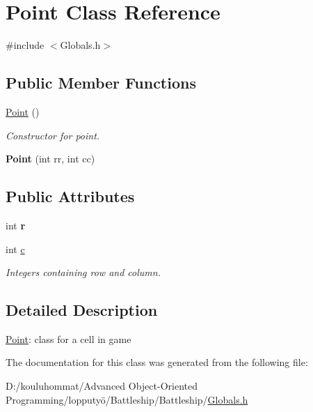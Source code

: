 \hypertarget{class_point}{}\section{Point Class Reference}
\label{class_point}


{\ttfamily \#include $<$Globals.\+h$>$}

\subsection*{Public Member Functions}
\begin{DoxyCompactItemize}
\item 
\mbox{\label{class_point_ad92f2337b839a94ce97dcdb439b4325a}} 
\mbox{\hyperlink{class_point_ad92f2337b839a94ce97dcdb439b4325a}{Point}} ()
\begin{DoxyCompactList}\small\item\em Constructor for point. \end{DoxyCompactList}\item 
\mbox{\label{class_point_a960b60e4a0e680c368e8437f48f7d0fd}} 
{\bfseries Point} (int rr, int cc)
\end{DoxyCompactItemize}
\subsection*{Public Attributes}
\begin{DoxyCompactItemize}
\item 
\mbox{\label{class_point_a5eec80a5eba17a6cfc509a17125a5f17}} 
int {\bfseries r}
\item 
\mbox{\label{class_point_a8277737deb586b2625d3106aa2fe32d6}} 
int \mbox{\hyperlink{class_point_a8277737deb586b2625d3106aa2fe32d6}{c}}
\begin{DoxyCompactList}\small\item\em Integers containing row and column. \end{DoxyCompactList}\end{DoxyCompactItemize}


\subsection{Detailed Description}
\mbox{\hyperlink{class_point}{Point}}\+: class for a cell in game 

The documentation for this class was generated from the following file\+:\begin{DoxyCompactItemize}
\item 
D\+:/kouluhommat/\+Advanced Object-\/\+Oriented Programming/lopputyö/\+Battleship/\+Battleship/\mbox{\hyperlink{_globals_8h}{Globals.\+h}}\end{DoxyCompactItemize}
